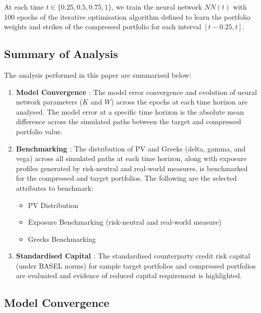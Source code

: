 \noindent At each time $t \in \{0.25, 0.5, 0.75, 1\}$, we train the neural network $NN(t)$ with 100 epochs of the iterative optimisation algorithm defined to learn the portfolio weights and strikes of the compressed portfolio for each interval $[t-0.25, t]$.

\subsection{Summary of Analysis}
The analysis performed in this paper are summarised below:

\begin{enumerate}
    \item {\bf Model Convergence \bf}: The model error convergence and evolution of neural network parameters ($K$ and $W$) across the epochs at each time horizon are analysed. The model error at a specific time horizon is the absolute mean difference across the simulated paths between the target and compressed portfolio value.
    \item {\bf Benchmarking \bf}: The distribution of PV and Greeks (delta, gamma, and vega) across all simulated paths at each time horizon, along with exposure profiles generated by risk-neutral and real-world measures, is benchmarked for the compressed and target portfolios. The following are the selected attributes to benchmark:
        \begin{itemize}
            \item PV Distribution 
            \item Exposure Benchmarking (risk-neutral and real-world measure)
            \item Greeks Benchmarking
        \end{itemize}
    \item {\bf Standardised Capital \bf}: The standardised counterparty credit risk capital (under BASEL norms) for sample target portfolios and compressed portfolios are evaluated and evidence of reduced capital requirement is highlighted.
\end{enumerate}


\subsection{Model Convergence}
\label{Model Convergence}

